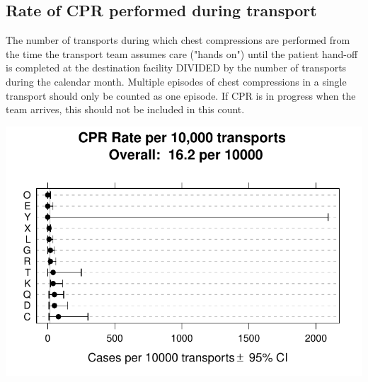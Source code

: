 \documentclass[twoside]{article}\usepackage[]{graphicx}\usepackage[]{color}
\makeatletter
\def\maxwidth{ %
  \ifdim\Gin@nat@width>\linewidth
    \linewidth
  \else
    \Gin@nat@width
  \fi
}
\newenvironment{knitrout}{}{} %
\makeatother
\begin{document}
\newpage
\subsection{Rate of CPR performed during transport}
The number of transports during which chest compressions are performed from the time the transport team assumes care ("hands on") until the patient hand-off is completed at the destination facility DIVIDED by the number of transports during the calendar month. Multiple episodes of chest compressions in a single transport should only be counted as one episode. If CPR is in progress when the team arrives, this should not be included in this count.

\begin{center}
\begin{knitrout}
\color{fgcolor}
\includegraphics[width=\maxwidth]{figure/r_cpr} 

\end{knitrout}

\end{center}
\end{document}
